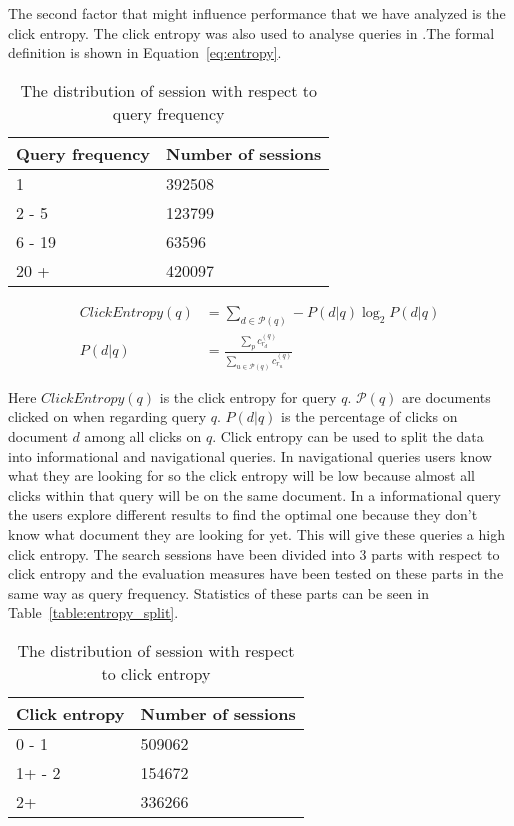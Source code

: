 The second factor that might influence performance that we have analyzed is the click entropy. The click entropy was also used to analyse queries in \cite{dou2008}.The formal definition is shown in Equation~\ref{eq:entropy}.

\begin{table}
\centering
\begin{tabular}{|l|l|}
\hline
Query frequency & Number of sessions \\ \hline
1               & 392508            \\ \hline
2 - 5           & 123799            \\ \hline
6 - 19          & 63596             \\ \hline
20 +            & 420097            \\ \hline
\end{tabular}
\caption{The distribution of session with respect to query frequency}
\label{table:query_split}
\end{table}

\begin{align}
	ClickEntropy(q) &= \sum_{d \in \mathcal{P}(q)} - P(d|q) \log_2 P(d|q) \label{eq:entropy} \\
	P(d|q) &= \frac{\sum_p c_{r_d}^{(q)}}{\sum_{u \in \mathcal{P}(q)} c_{r_u}^{(q)}} \label{eq:entropy_2}
\end{align}

Here $ClickEntropy(q)$ is the click entropy for query $q$. $\mathcal{P}(q)$ are documents clicked on when regarding query $q$. $P(d|q)$ is the percentage of clicks on document $d$ among all clicks on $q$.  Click entropy can be used to split the data into informational and navigational queries. In navigational queries users know what they are looking for so the click entropy will be low because almost all clicks within that query will be on the same document. In a informational query the users explore different results to find the optimal one because they don't know what document they are looking for yet. This will give these queries a high click entropy.
The search sessions have been divided into 3 parts with respect to click entropy and the evaluation measures have been tested on these parts in the same way as query frequency. Statistics of these parts can be seen in Table~\ref{table:entropy_split}.

\begin{table}
\centering
\begin{tabular}{|l|l|}
\hline
Click entropy & Number of sessions \\ \hline
0 - 1         & 509062             \\ \hline
1+ - 2        & 154672             \\ \hline
2+            & 336266             \\ \hline
\end{tabular}
\caption{The distribution of session with respect to click entropy}
\end{table}

